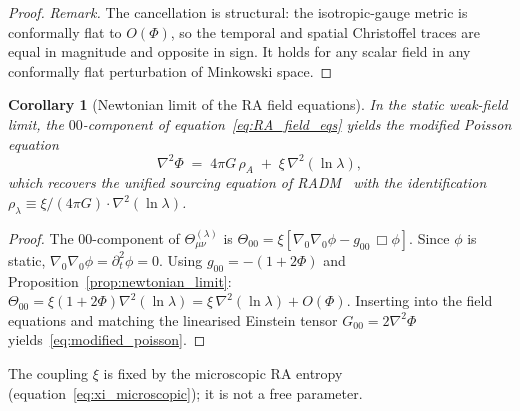 \documentclass[11pt,a4paper]{article}
\theoremstyle{plain}
\newtheorem{corollary}[theorem]{Corollary}
\theoremstyle{definition}
\theoremstyle{remark}
\begin{document}
\begin{description}
\begin{proof}
\smallskip\noindent
\emph{Remark.} The cancellation is structural: the isotropic-gauge metric is
conformally flat to $O(\Phi)$, so the temporal and spatial Christoffel traces
are equal in magnitude and opposite in sign. It holds for any scalar field
in any conformally flat perturbation of Minkowski space.
\end{proof}

\begin{corollary}[Newtonian limit of the RA field equations]
\label{cor:poisson_ra}
In the static weak-field limit, the $00$-component of
equation~\eqref{eq:RA_field_eqs} yields the modified Poisson equation
\begin{equation}
  \nabla^2\Phi \;=\; 4\pi G\,\rho_A \;+\; \xi\,\nabla^2(\ln\lambda),
  \label{eq:modified_poisson}
\end{equation}
which recovers the unified sourcing equation of
RADM~\citep{Sandeman2026RADM} with the identification
$\rho_\lambda \equiv \xi/(4\pi G)\cdot\nabla^2(\ln\lambda)$.
\end{corollary}

\begin{proof}
The $00$-component of $\Theta_{\mu\nu}^{(\lambda)}$ is
$\Theta_{00} = \xi[\nabla_0\nabla_0\phi - g_{00}\,\Box\phi]$.
Since $\phi$ is static, $\nabla_0\nabla_0\phi = \partial_t^2\phi = 0$.
Using $g_{00} = -(1+2\Phi)$ and Proposition~\ref{prop:newtonian_limit}:
$\Theta_{00} = \xi(1+2\Phi)\nabla^2(\ln\lambda) = \xi\,\nabla^2(\ln\lambda) + O(\Phi)$.
Inserting into the field equations and matching the linearised Einstein tensor
$G_{00} = 2\nabla^2\Phi$ yields~\eqref{eq:modified_poisson}.
\end{proof}

\noindent
The coupling $\xi$ is fixed by the microscopic RA entropy
(equation~\eqref{eq:xi_microscopic}); it is not a free parameter.


\end{description}
\end{document}
